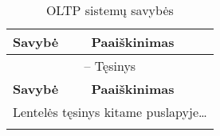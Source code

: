 \documentclass[12pt,a4paper,titlepage]{article}
\begin{document}
\begin{longtable}{|p{3cm}|p{9.8cm}|}
\caption{OLTP sistemų savybės \label{table:oltpsavybes}}\\

\hline \hline
{\textbf{Savybė}} &
{\textbf{Paaiškinimas}}\\
\hline
\endfirsthead


\multicolumn{2}{c}{{\tablename} \thetable{} -- Tęsinys} \\[0.5ex]
\hline \hline
{\textbf{Savybė}} &
{\textbf{Paaiškinimas}}\\
\hline
\endhead


\multicolumn{2}{l}{{Lentelės tęsinys kitame puslapyje\ldots}} \\
\endfoot



\end{longtable}
\end{document}
